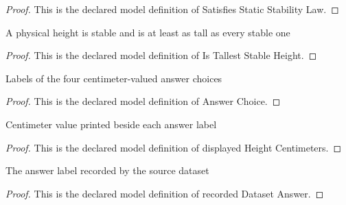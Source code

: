 \begin{proof}
  This is the declared model definition of Satisfies Static Stability Law.
\end{proof}
\begin{definition}
  \label{def:physics:phyx-mini-0710:phyxminiproblems-problemphyxmini0710-istalleststableheight}
  A physical height is stable and is at least as tall as every stable one
\end{definition}
\begin{proof}
  This is the declared model definition of Is Tallest Stable Height.
\end{proof}
\begin{definition}
  \label{def:physics:phyx-mini-0710:phyxminiproblems-problemphyxmini0710-answerchoice}
  Labels of the four centimeter-valued answer choices
\end{definition}
\begin{proof}
  This is the declared model definition of Answer Choice.
\end{proof}
\begin{definition}
  \label{def:physics:phyx-mini-0710:phyxminiproblems-problemphyxmini0710-displayedheightcentimeters}
  Centimeter value printed beside each answer label
\end{definition}
\begin{proof}
  This is the declared model definition of displayed Height Centimeters.
\end{proof}
\begin{definition}
  \label{def:physics:phyx-mini-0710:phyxminiproblems-problemphyxmini0710-recordeddatasetanswer}
  The answer label recorded by the source dataset
\end{definition}
\begin{proof}
  This is the declared model definition of recorded Dataset Answer.
\end{proof}
